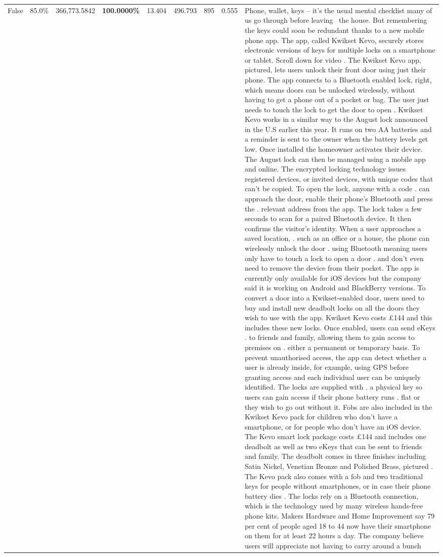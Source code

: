 \begin{table}[H]
\begin{tabular}{lllrlllll}
False & 85.0\% & 366,773.5842 & \bfseries \color{red} 100.0000\% & 13.404 & 496.793 & 895 & 0.555 & Phone, wallet, keys – it’s the usual mental checklist many of us go through before leaving  the house. But remembering the keys could soon be redundant thanks to a new mobile phone app. The app, called Kwikset Kevo, securely stores electronic versions of keys for multiple locks on a smartphone or tablet. Scroll down for video . The Kwikset Kevo app, pictured, lets users unlock their front door using just their phone. The app connects to a Bluetooth enabled lock, right, which means doors can be unlocked wirelessly, without having to get a phone out of a pocket or bag. The user just needs to touch the lock to get the door to open . Kwikset Kevo works in a similar way to the August lock announced in the U.S earlier this year. It runs on two AA batteries and a reminder is sent to the owner when the battery levels get low. Once installed the homeowner activates their device. The August lock can then be managed using a mobile app and online. The encrypted locking technology issues registered devices, or invited devices, with unique codes that can't be copied. To open the lock, anyone with a code . can approach the door, enable their phone's Bluetooth and press the . relevant address from the app. The lock takes a few seconds to scan for a paired Bluetooth device. It then confirms the visitor's identity. When a user approaches a saved location, . such as an office or a house, the phone can wirelessly unlock the door . using Bluetooth meaning users only have to touch a lock to open a door . and don't even need to remove the device from their pocket. The app is currently only available for iOS devices but the company said it is working on Android and BlackBerry versions. To convert a door into a Kwikset-enabled door, users need to buy and install new deadbolt locks on all the doors they wish to use with the app. Kwikset Kevo costs £144 and this includes these new locks. Once enabled, users can send eKeys . to friends and family, allowing them to gain access to premises on . either a permanent or temporary basis. To prevent unauthorised access, the app can detect whether a user is already inside, for example, using GPS before granting access and each individual user can be uniquely identified. The locks are supplied with . a physical key so users can gain access if their phone battery runs . flat or they wish to go out without it. Fobs are also included in the Kwikset Kevo pack for children who don't have a smartphone, or for people who don't have an iOS device. The Kevo smart lock package costs £144 and includes one deadbolt as well as two eKeys that can be sent to friends and family. The deadbolt comes in three finishes including Satin Nickel, Venetian Bronze and Polished Brass, pictured . The Kevo pack also comes with a fob and two traditional keys for people without smartphones, or in case their phone battery dies . The locks rely on a Bluetooth connection, which is the technology used by many wireless hands-free phone kits. Makers Hardware and Home Improvement say 79 per cent of people aged 18 to 44 now have their smartphone on them for at least 22 hours a day. The company believe users will appreciate not having to carry around a bunch 
\end{tabular}
\end{table}
